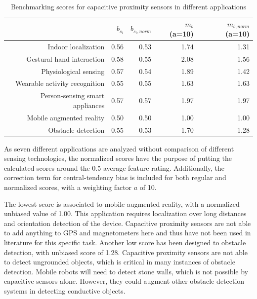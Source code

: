 \begin{table}[htbp]
  \centering
  \caption{Benchmarking scores for capacitive proximity sensors in different applications}
   \begin{tabular}{rrrrr}
    \toprule
          & $b_{s_l}$ & $b_{s_l,norm}$ & $m_b$ (a=10) & $m_{b,norm}$ (a=10) \\
    \midrule
    Indoor localization & 0.56  & 0.53  & 1.74  & 1.31 \\
    Gestural hand interaction & 0.58  & 0.55  & 2.08  & 1.56 \\
    Physiological sensing & 0.57  & 0.54  & 1.89  & 1.42 \\
    Wearable activity recognition & 0.55  & 0.55  & 1.63  & 1.63 \\
    Person-sensing smart appliances & 0.57  & 0.57  & 1.97  & 1.97 \\
    Mobile augmented reality & 0.50  & 0.50  & 1.00  & 1.00 \\
    Obstacle detection & 0.55  & 0.53  & 1.70  & 1.28 \\
    \bottomrule
    \end{tabular}%
  \label{tab:bench_capapps_scores}%
\end{table}%

As seven different applications are analyzed without comparison of different sensing technologies, the normalized scores have the purpose of putting the calculated scores around the 0.5 average feature rating. Additionally, the correction term for central-tendency bias is included for both regular and normalized scores, with a weighting factor $a$ of 10.

The lowest score is associated to mobile augmented reality, with a normalized unbiased value of 1.00. This application requires localization over long distances and orientation detection of the device. Capacitive proximity sensors are not able to add anything to GPS and magnetometers here and thus have not been used in literature for this specific task. Another low score has been designed to obstacle detection, with unbiased score of 1.28. Capacitive proximity sensors are not able to detect ungrounded objects, which is critical in many instances of obstacle detection. Mobile robots will need to detect stone walls, which is not possible by capacitive sensors alone. However, they could augment other obstacle detection systems in detecting conductive objects. 

